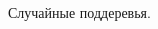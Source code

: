 \documentclass[unicode, notheorems]{beamer}
\begin{document}
\begin{frame}
\begin{columns}
\begin{column}{0.5\textwidth}
\begin{figure}[h]
                \caption{Случайные поддеревья.}
                \label{fig:random_subtree_modified_ev}
            \end{figure}
        \end{column}
        
    \end{columns}
\end{frame}




\end{document}
